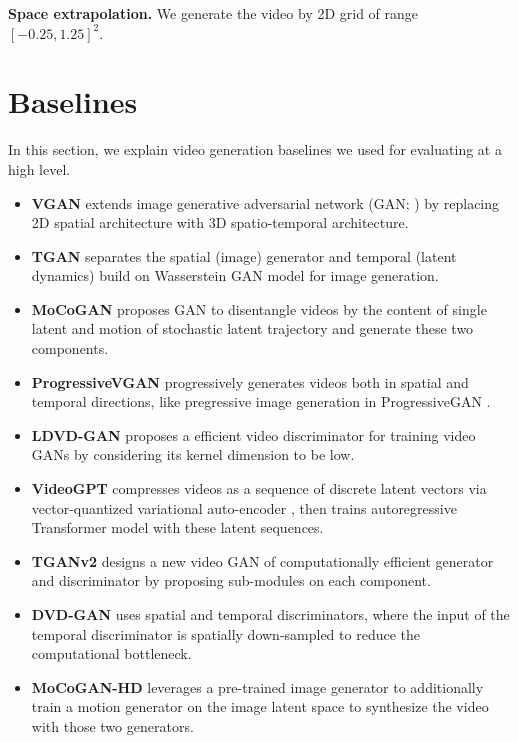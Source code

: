\documentclass{article} \usepackage{iclr2022_conference,times}
\begin{document}
\textbf{Space extrapolation.} 
We generate the video by 2D grid of range $[-0.25, 1.25]^{2}$. 














 \section{Baselines}
\label{appen:baselines}
In this section,
we explain video generation baselines we used for evaluating \sname at a high level. 
\begin{itemize}[leftmargin=0.2in]
\item \textbf{VGAN} \citep{vondrick2016generating} extends image generative adversarial network (GAN; \citep{goodfellow2014generative}) by replacing 2D spatial architecture with 3D spatio-temporal architecture.

\item \textbf{TGAN} \citep{saito2017temporal} separates the spatial (image) generator and temporal (latent dynamics) build on Wasserstein GAN \citep{arjovsky2017wasserstein} model for image generation. 

\item \textbf{MoCoGAN} \citep{tulyakov2018mocogan} proposes GAN to disentangle videos by the content of single latent and motion of stochastic latent trajectory and generate these two components.

\item \textbf{ProgressiveVGAN} \citep{acharya2018towards} progressively generates videos both in spatial and temporal directions, like pregressive image generation in ProgressiveGAN \citep{karras2017progressive}.

\item \textbf{LDVD-GAN} \citep{kahembwe2020lower} proposes a efficient video discriminator for training video GANs by considering its kernel dimension to be low.

\item \textbf{VideoGPT} \citep{yan2021videogpt} compresses videos as a sequence of discrete latent vectors via vector-quantized variational auto-encoder \citep{van2017neural}, then trains autoregressive Transformer model \citep{vaswani2017attention} with these latent sequences.

\item \textbf{TGANv2} \citep{saito2020train} designs a new video GAN of computationally efficient generator and discriminator by proposing sub-modules on each component.

\item \textbf{DVD-GAN} \citep{clark2019adversarial} uses spatial and temporal discriminators, where the input of the temporal discriminator is spatially down-sampled to reduce the computational bottleneck.
 

\item \textbf{MoCoGAN-HD} \citep{tian2021good} leverages a pre-trained image generator to additionally train a motion generator on the image latent space to synthesize the video with those two generators.
\end{itemize}
\end{document}
